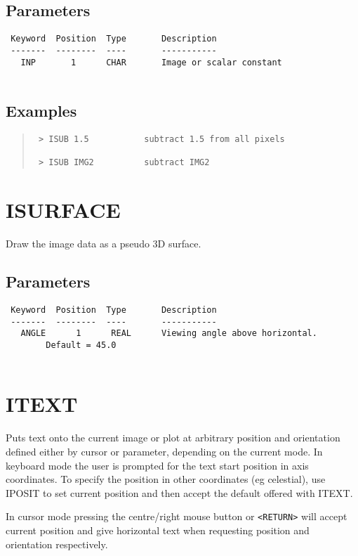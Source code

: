 \documentclass{book}
\renewcommand{\_}{{\tt\char'137}}     %
\begin{document}
\subsection{Parameters}
\begin{verbatim}
 Keyword  Position  Type       Description
 -------  --------  ----       -----------
   INP       1      CHAR       Image or scalar constant
 
\end{verbatim}\subsection{Examples}
\begin{quote}\begin{verbatim}
 > ISUB 1.5           subtract 1.5 from all pixels
 
 > ISUB IMG2          subtract IMG2
 \end{verbatim}\end{quote}
\section{ISURFACE}
Draw the image data as a pseudo 3D surface.
 
\subsection{Parameters}
\begin{verbatim}
 Keyword  Position  Type       Description
 -------  --------  ----       -----------
   ANGLE      1      REAL      Viewing angle above horizontal.
        Default = 45.0
 
\end{verbatim}\section{ITEXT}
Puts text onto the current image or plot at arbitrary position
and orientation defined either by cursor or parameter, depending
on the current mode. In keyboard mode the user is prompted for
the text start position in axis coordinates. To specify the
position in other coordinates (eg celestial), use IPOSIT to
set current position and then accept the default offered with
ITEXT.
 
In cursor mode pressing the centre/right mouse button or \verb+<RETURN>+
will accept current position and give horizontal text when
requesting position and orientation respectively.
 
\end{document}
